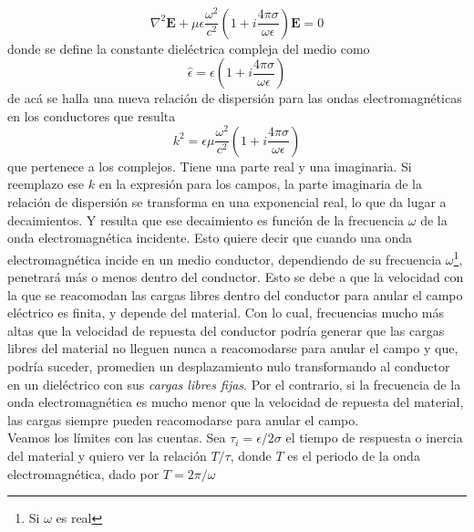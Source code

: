 \begin{equation*}
    \nabla^{2}\textbf{E} 
    + \mu\epsilon
    \frac{\omega^{2}}{c^{2}}
    \left(
        1 + i\frac{4\pi\sigma}{\omega \epsilon}
    \right)\textbf{E} = 0
\end{equation*}
donde se define la constante dieléctrica compleja del medio como 
\begin{equation*}
    \hat{\epsilon} = 
    \epsilon
    \left(
        1 + i\frac{4\pi\sigma}{\omega \epsilon}
    \right)
\end{equation*}
de acá se halla una nueva relación de dispersión para las ondas electromagnéticas en los conductores que resulta
\begin{equation*}
    k^{2} =  
    \epsilon\mu\frac{\omega^{2}}{c^{2}}
    \left(
        1 + i\frac{4\pi\sigma}{\omega \epsilon}
    \right)
\end{equation*}
que pertenece a los complejos. Tiene una parte real y una imaginaria. Si reemplazo ese $k$ en la expresión para los campos, la parte imaginaria de la relación de dispersión se transforma en una exponencial real, lo que da lugar a decaimientos. Y resulta que ese decaimiento es función de la frecuencia $\omega$ de la onda electromagnética incidente. Esto quiere decir que cuando una onda electromagnética incide en un medio conductor, dependiendo de su frecuencia $\omega$\footnote{Si $\omega$ es real}, penetrará más o menos dentro del conductor. Esto se debe a que la velocidad con la que se reacomodan las cargas libres dentro del conductor para anular el campo eléctrico es finita, y depende del material. Con lo cual, frecuencias mucho más altas que la velocidad de repuesta del conductor podría generar que las cargas libres del material no lleguen nunca a reacomodarse para anular el campo y que, podría suceder, promedien un desplazamiento nulo transformando al conductor en un dieléctrico con sus \textit{cargas libres fijas}. Por el contrario, si la frecuencia de la onda electromagnética es mucho menor que la velocidad de repuesta del material, las cargas siempre pueden reacomodarse para anular el campo.\\
\indent Veamos los límites con las cuentas. Sea $\tau_{i} = \epsilon/2\sigma$ el tiempo de respuesta o inercia del material y quiero ver la relación $T/\tau$, donde $T$ es el periodo de la onda electromagnética, dado por $T = 2\pi/\omega$
